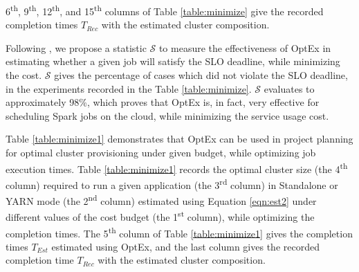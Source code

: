 \documentclass[conference]{IEEEtran}
\begin{document}
  6\textsuperscript{th},  9\textsuperscript{th}, 12\textsuperscript{th}, and
 15\textsuperscript{th} columns of Table \ref{table:minimize} give the recorded completion times $T_{Rec}$ with the estimated cluster composition.  \par Following \cite{Verma:2011:AAR:1998582.1998637}, we propose a statistic $\mathcal{S}$ to measure the effectiveness of
OptEx in estimating whether a given job will satisfy the SLO deadline, while minimizing the cost. $\mathcal{S}$ gives the percentage of cases
which did not violate the SLO deadline, in the experiments recorded in the Table
\ref{table:minimize}. $\mathcal{S}$ evaluates to approximately 98\%, which proves that OptEx is, in
fact, very effective for scheduling Spark jobs on the cloud, while minimizing the service usage cost. \par Table \ref{table:minimize1} demonstrates that OptEx can be used in project planning for optimal cluster
 provisioning under given budget, while optimizing job execution times. Table \ref{table:minimize1} records the optimal cluster size (the 4\textsuperscript{th} column)
 required to run a given application (the 3\textsuperscript{rd} column) in Standalone or YARN mode (the
 2\textsuperscript{nd} column) estimated using Equation \ref{eqn:est2}
under different values of the  cost budget (the 1\textsuperscript{st} column), while optimizing the completion times.
The 5\textsuperscript{th} column of Table \ref{table:minimize1} gives the completion times $T_{Est}$ estimated using OptEx, and the last
column gives the recorded completion time $T_{Rec}$ with the estimated cluster composition. 

$\newcommand{\Var}{\mathrm{Var}}$
\end{document}
